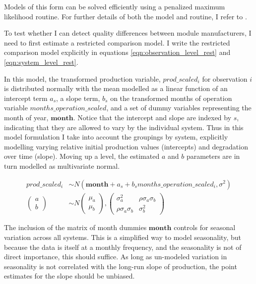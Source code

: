 \documentclass[12pt]{article}
\begin{document}
Models of this form can be solved efficiently using a penalized maximum likelihood routine. For further details of both the model and routine, I refer to \citet{bates_fitting_2015}.

To test whether I can detect quality differences between module manufacturers, I need to first estimate a restricted comparison model. I write the restricted comparison model explicitly in equations \ref{eqn:observation_level_rest} and \ref{eqn:system_level_rest}.

In this model, the transformed production variable, $prod\_scaled_{i}$ for observation $i$ is distributed normally with the mean modelled as a linear function of an intercept term $a_s$, a slope term, $b_s$ on the transformed months of operation variable $months\_operation\_scaled$, and a set of dummy variables representing the month of year, $\mathbf{month}$. Notice that the intercept and slope are indexed by $s$, indicating that they are allowed to vary by the individual system. Thus in this model formulation I take into account the groupings by system, explicitly modelling varying relative initial production values (intercepts) and degradation over time (slope). Moving up a level, the estimated $a$ and $b$ parameters are in turn modelled as multivariate normal.

\begin{align}
prod\_scaled_{i} &\sim N(\mathbf{month} + a_s + b_s months\_operation\_scaled_{i}, \sigma^2)\\
\label{eqn:observation_level_rest}
\begin{pmatrix}
  a\\
  b
\end{pmatrix}
&\sim N
\begin{pmatrix}
  \mu_a\\
  \mu_b
\end{pmatrix},
\begin{pmatrix}
  \sigma_a^2 & \rho \sigma_a \sigma_b \\
  \rho \sigma_a \sigma_b & \sigma_b^2
\end{pmatrix}
\end{align}

The inclusion of the matrix of month dummies $\mathbf{month}$ controls for seasonal variation across all systems. This is a simplified way to model seasonality, but because the data is itself at a monthly frequency, and the seasonality is not of direct importance, this should suffice. As long as un-modeled variation in seasonality is not correlated with the long-run slope of production, the point estimates for the slope should be unbiased.
\end{document}
